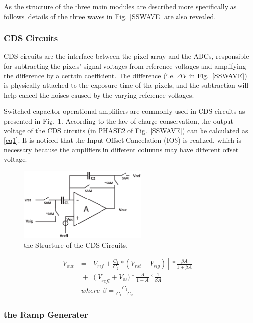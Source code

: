 \documentclass[conference]{IEEEtran}
\begin{document}
As the structure of the three main modules are described more specifically as follows, details of the three waves in Fig.~\ref{SSWAVE} are also revealed.

\subsubsection{CDS Circuits}

CDS circuits are the interface between the pixel array and the ADCs, responsible for subtracting the pixels’ signal voltages from reference voltages and amplifying the difference by a certain coefficient. The difference (i.e. $\Delta{V}$ in Fig.~\ref{SSWAVE}) is physically attached to the exposure time of the pixels, and the subtraction will help cancel the noises caused by the varying reference voltages. 

Switched-capacitor operational amplifiers are commonly used in CDS circuits as presented in Fig.~\ref{CDS}. According to the law of charge conservation, the output voltage of the CDS circuits (in PHASE2 of Fig.~\ref{SSWAVE}) can be calculated as \eqref{eq1}. It is noticed that the Input Offset Cancelation (IOS) is realized, which is necessary because the amplifiers in different columns may have different offset voltage.
\begin{figure}[htbp]
	\centerline{\includegraphics[width=2.5in]{./Figures/CDS.eps}}
	\caption{the Structure of the CDS Circuits.}
	\label{CDS}
\end{figure} 
\begin{equation}
\begin{aligned}
	V_{out}&=\left[ V_{ref}+\frac{C_1}{C_2}\ast\left(V_{rst}-V_{sig}\right)\right]\ast\frac{\beta A}{1+\beta A}\\
	 &\;{+}\;\left(V\right._{refl}+V_{os})\ast\frac{A}{1+A}\ast\frac{1}{\beta A}\\
	 &\;where\ \ \beta=\frac{C_2}{C_1+C_2}
	\label{eq1}
\end{aligned}
\end{equation}

\subsubsection{the Ramp Generater}
\end{document}
